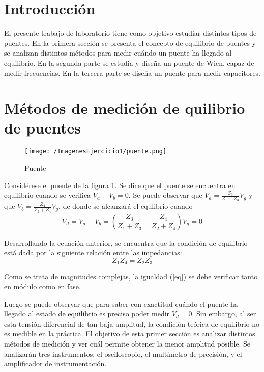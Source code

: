 


	\section{Introducción}

El presente trabajo de laboratorio tiene como objetivo estudiar distintos tipos de puentes. En la primera sección se presenta el concepto de equilibrio de puentes y se analizan distintos métodos para medir cuándo un puente ha llegado al equilibrio. En la segunda parte se estudia y diseña un puente de Wien, capaz de medir frecuencias. En la tercera parte se diseña un puente para medir capacitores. 

\section{Métodos de medición de quilibrio de puentes}
\begin{figure}[H]
	\centering
	\texttt{[image: /ImagenesEjercicio1/puente.png]}
\caption{Puente}
	\label{fig:pte}
\end{figure}


Considérese el puente de la figura 1. Se dice que el puente se encuentra en equilibrio cuando se verifica $V_a-V_b=0$. Se puede observar que $V_a=\frac{Z_3}{Z_1+Z_3}V_g$ y que $V_b=\frac{Z_4}{Z_2+Z_4}V_g$, de donde se alcanzará el equlibrio cuando \begin{equation}
    V_d=V_a-V_b=(\frac{Z_3}{Z_1+Z_3}-\frac{Z_4}{Z_2+Z_4})V_g=0
\end{equation}

Desarrollando la ecuación anterior, se encuentra que la condición de equilibrio está dada por la siguiente relación entre las impedancias:
\begin{equation}
\label{eq}
    Z_1Z_4=Z_2Z_3
\end{equation}

Como se trata de magnitudes complejas, la igualdad (\ref{eq}) se debe verificar tanto en módulo como en fase.

Luego se puede observar que para saber con exactitud cuándo el puente ha llegado al estado de equilibrio es preciso poder medir $V_d=0$. Sin embargo, al ser esta tensión diferencial de tan baja amplitud, la condición teórica de equilibrio no es medible en la práctica. El objetivo de esta primer sección es analizar distintos métodos de medición y ver cuál permite obtener la menor amplitud posible. Se analizarán tres instrumentos: el osciloscopio, el multímetro de precisión, y el amplificador de instrumentación. 

